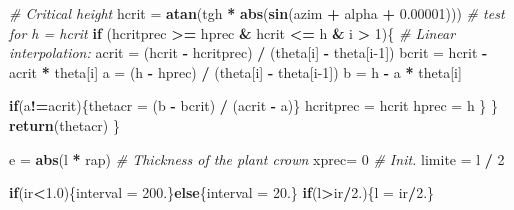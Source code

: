 \documentclass[
]{book}
\newenvironment{Shaded}{\begin{snugshade}}{\end{snugshade}}
\newcommand{\CommentTok}[1]{\textcolor[rgb]{0.56,0.35,0.01}{\textit{#1}}}
\newcommand{\ControlFlowTok}[1]{\textcolor[rgb]{0.13,0.29,0.53}{\textbf{#1}}}
\newcommand{\DecValTok}[1]{\textcolor[rgb]{0.00,0.00,0.81}{#1}}
\newcommand{\FloatTok}[1]{\textcolor[rgb]{0.00,0.00,0.81}{#1}}
\newcommand{\KeywordTok}[1]{\textcolor[rgb]{0.13,0.29,0.53}{\textbf{#1}}}
\newcommand{\NormalTok}[1]{#1}
\newcommand{\OperatorTok}[1]{\textcolor[rgb]{0.81,0.36,0.00}{\textbf{#1}}}
\newcommand{\StringTok}[1]{\textcolor[rgb]{0.31,0.60,0.02}{#1}}
\begin{document}
\begin{Shaded}
\begin{Highlighting}[]
    \CommentTok{# Critical height}
\NormalTok{    hcrit =}\StringTok{ }\KeywordTok{atan}\NormalTok{(tgh }\OperatorTok{*}\StringTok{ }\KeywordTok{abs}\NormalTok{(}\KeywordTok{sin}\NormalTok{(azim }\OperatorTok{+}\StringTok{ }\NormalTok{alpha }\OperatorTok{+}\StringTok{ }\FloatTok{0.00001}\NormalTok{)))}
    \CommentTok{# test for h = hcrit}
    \ControlFlowTok{if}\NormalTok{ (hcritprec }\OperatorTok{>=}\StringTok{ }\NormalTok{hprec }\OperatorTok{&}\StringTok{ }\NormalTok{hcrit }\OperatorTok{<=}\StringTok{ }\NormalTok{h }\OperatorTok{&}\StringTok{ }\NormalTok{i }\OperatorTok{>}\StringTok{ }\DecValTok{1}\NormalTok{)\{}
      \CommentTok{# Linear interpolation:}
\NormalTok{      acrit =}\StringTok{ }\NormalTok{(hcrit }\OperatorTok{-}\StringTok{ }\NormalTok{hcritprec) }\OperatorTok{/}\StringTok{ }\NormalTok{(theta[i] }\OperatorTok{-}\StringTok{ }\NormalTok{theta[i}\DecValTok{-1}\NormalTok{])}
\NormalTok{      bcrit =}\StringTok{ }\NormalTok{hcrit }\OperatorTok{-}\StringTok{ }\NormalTok{acrit }\OperatorTok{*}\StringTok{ }\NormalTok{theta[i]}
\NormalTok{      a =}\StringTok{ }\NormalTok{(h }\OperatorTok{-}\StringTok{ }\NormalTok{hprec) }\OperatorTok{/}\StringTok{ }\NormalTok{(theta[i] }\OperatorTok{-}\StringTok{ }\NormalTok{theta[i}\DecValTok{-1}\NormalTok{])}
\NormalTok{      b =}\StringTok{ }\NormalTok{h }\OperatorTok{-}\StringTok{ }\NormalTok{a }\OperatorTok{*}\StringTok{ }\NormalTok{theta[i]}
      
      \ControlFlowTok{if}\NormalTok{(a}\OperatorTok{!=}\NormalTok{acrit)\{thetacr =}\StringTok{ }\NormalTok{(b }\OperatorTok{-}\StringTok{ }\NormalTok{bcrit) }\OperatorTok{/}\StringTok{ }\NormalTok{(acrit }\OperatorTok{-}\StringTok{ }\NormalTok{a)\}}
\NormalTok{      hcritprec =}\StringTok{ }\NormalTok{hcrit}
\NormalTok{      hprec =}\StringTok{ }\NormalTok{h}
\NormalTok{    \}}
\NormalTok{  \}}
  \KeywordTok{return}\NormalTok{(thetacr)}
\NormalTok{\}}

\NormalTok{e =}\StringTok{ }\KeywordTok{abs}\NormalTok{(l }\OperatorTok{*}\StringTok{ }\NormalTok{rap) }\CommentTok{# Thickness of the plant crown}
\NormalTok{xprec=}\StringTok{ }\DecValTok{0}         \CommentTok{# Init.}
\NormalTok{limite =}\StringTok{ }\NormalTok{l }\OperatorTok{/}\StringTok{ }\DecValTok{2}

\ControlFlowTok{if}\NormalTok{(ir}\OperatorTok{<}\FloatTok{1.0}\NormalTok{)\{interval =}\StringTok{ }\FloatTok{200.}\NormalTok{\}}\ControlFlowTok{else}\NormalTok{\{interval =}\StringTok{ }\FloatTok{20.}\NormalTok{\}}
\ControlFlowTok{if}\NormalTok{(l}\OperatorTok{>}\NormalTok{ir}\OperatorTok{/}\FloatTok{2.}\NormalTok{)\{l =}\StringTok{ }\NormalTok{ir}\OperatorTok{/}\FloatTok{2.}\NormalTok{\}}


\end{Highlighting}
\end{Shaded}
\end{document}
